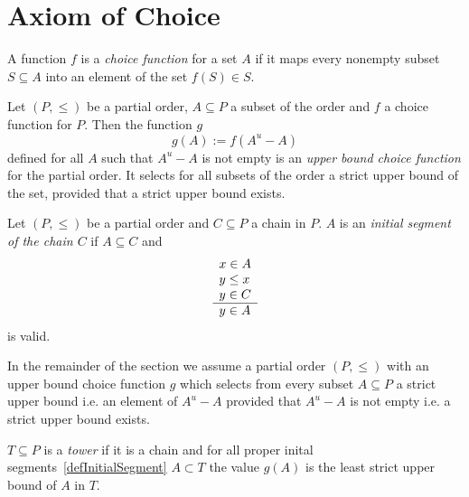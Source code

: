 \section{Axiom of Choice}




\begin{definition}
    \label{defChoiceFunction}
    A function $f$ is a \emph{choice function} for a set $A$ if it maps every
    nonempty subset $S \subseteq A$ into an element of the set $f(S) \in S$.
\end{definition}




\begin{definition}
    \label{defUpperChoiceFunction}
    Let $(P, \le)$ be a partial order, $A \subseteq P$ a subset of the order and
    $f$ a choice function for $P$. Then the function $g$
    $$
        g(A) := f(A^u - A)
    $$
    defined for all $A$ such that $A^u - A$ is not empty is an \emph{upper bound
    choice function} for the partial order. It selects for all subsets of the
    order a strict upper bound of the set, provided that a strict upper bound
    exists.
\end{definition}


\begin{definition}
    \label{defInitialSegment}
    Let $(P, \le)$ be a partial order and $C \subseteq P$ a chain in $P$. $A$ is
    an \emph{initial segment of the chain $C$} if $A \subseteq C$ and
    $$
    \begin{array}{l} 
        x \in A
            \\
            y \le x
            \\
            y \in C
     \\ \hline 
        y \in A
    \end{array}
    $$
    is valid.
\end{definition}




In the remainder of the section we assume a partial order $(P,\le)$ with an
upper bound choice function $g$ which selects from every subset $A \subseteq P$
a strict upper bound i.e. an element of $A^u - A$ provided that $A^u - A$ is not
empty i.e. a strict upper bound exists.


\begin{definition}
    \label{defTower}
    $T \subseteq P$ is a \emph{tower} if it is a chain and for all proper inital
    segments~\ref{defInitialSegment} $A \subset T$ the value $g(A)$ is the least
    strict upper bound of $A$ in $T$.
\end{definition}


